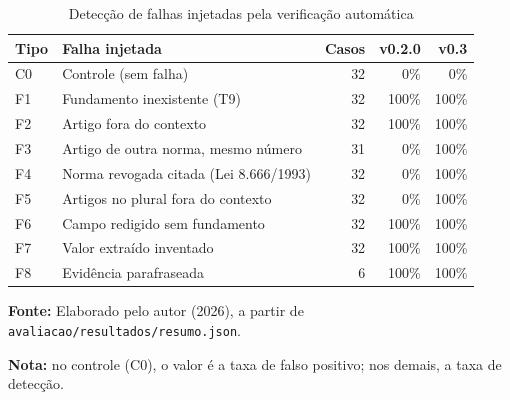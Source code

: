 \begin{table}[htbp]
\caption{Detecção de falhas injetadas pela verificação automática}\label{tab:verificacao}
\centering\small
\setlength{\tabcolsep}{4pt}
\begin{tabular}{llrrr}
\toprule
Tipo & Falha injetada & Casos & v0.2.0 & v0.3 \\
\midrule
C0 & Controle (sem falha) & 32 & 0\% & 0\% \\
F1 & Fundamento inexistente (T9) & 32 & 100\% & 100\% \\
F2 & Artigo fora do contexto & 32 & 100\% & 100\% \\
F3 & Artigo de outra norma, mesmo número & 31 & 0\% & 100\% \\
F4 & Norma revogada citada (Lei 8.666/1993) & 32 & 0\% & 100\% \\
F5 & Artigos no plural fora do contexto & 32 & 0\% & 100\% \\
F6 & Campo redigido sem fundamento & 32 & 100\% & 100\% \\
F7 & Valor extraído inventado & 32 & 100\% & 100\% \\
F8 & Evidência parafraseada & 6 & 100\% & 100\% \\
\bottomrule
\end{tabular}
\par\smallskip
\begin{minipage}{\linewidth}{\small \textbf{Fonte:} Elaborado pelo autor (2026), a partir de \texttt{avaliacao/resultados/resumo.json}.}\par
{\small \textbf{Nota:} no controle (C0), o valor é a taxa de falso positivo; nos demais, a taxa de detecção.}\end{minipage}
\end{table}
